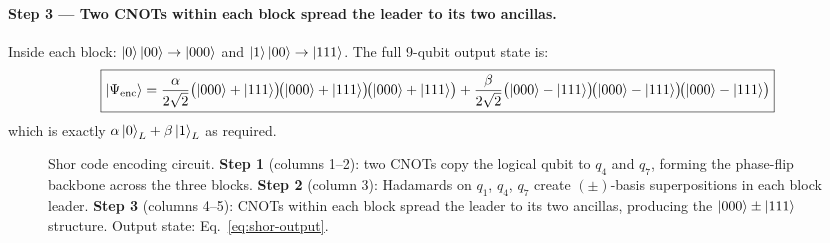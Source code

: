 \documentclass[11pt, a4paper]{article}
\theoremstyle{definition}
\theoremstyle{plain}
\theoremstyle{remark}
\begin{document}
\paragraph{Step 3 --- Two CNOTs within each block spread the leader to its
two ancillas.}
Inside each block: $\ket{0}\ket{00}\to\ket{000}$ and
$\ket{1}\ket{00}\to\ket{111}$.
The full 9-qubit output state is:
\begin{equation}
  \boxed{
  \ket{\Psi_{\mathrm{enc}}}
  = \frac{\alpha}{2\sqrt{2}}
    \bigl(\ket{000}+\ket{111}\bigr)\!
    \bigl(\ket{000}+\ket{111}\bigr)\!
    \bigl(\ket{000}+\ket{111}\bigr)
  + \frac{\beta}{2\sqrt{2}}
    \bigl(\ket{000}-\ket{111}\bigr)\!
    \bigl(\ket{000}-\ket{111}\bigr)\!
    \bigl(\ket{000}-\ket{111}\bigr)
  }
\label{eq:shor-output}
\end{equation}
which is exactly $\alpha\ket{0}_L + \beta\ket{1}_L$ as required.

\begin{figure}[H]
\centering
{}
\caption{Shor code encoding circuit.
\textbf{Step 1} (columns 1--2): two CNOTs copy the logical qubit to
$q_4$ and $q_7$, forming the phase-flip backbone across the three blocks.
\textbf{Step 2} (column 3): Hadamards on $q_1$, $q_4$, $q_7$ create
$(\pm)$-basis superpositions in each block leader.
\textbf{Step 3} (columns 4--5): CNOTs within each block spread the leader
to its two ancillas, producing the $\ket{000}\pm\ket{111}$ structure.
Output state: Eq.~\eqref{eq:shor-output}.}
\label{fig:shor-encoding}
\end{figure}
\end{document}
